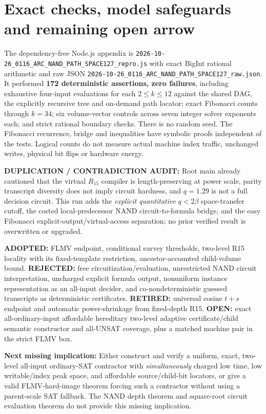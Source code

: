 \documentclass[11pt]{article}
\begin{document}
\section{Exact checks, model safeguards and remaining open arrow}
The dependency-free Node.js appendix is \texttt{2026-10-26\_0116\_ARC\_NAND\_PATH\_SPACE127\_repro.js} with exact BigInt rational arithmetic and raw JSON \texttt{2026-10-26\_0116\_ARC\_NAND\_PATH\_SPACE127\_raw.json}. It performed \textbf{172 deterministic assertions, zero failures}, including exhaustive four-input evaluations for each $2\le k\le12$ against the shared DAG, the explicitly recursive tree and on-demand path locator; exact Fibonacci counts through $k=34$; six volume-vector controls across seven integer solver exponents each; and strict rational boundary checks. There is no random seed. The Fibonacci recurrence, bridge and inequalities have symbolic proofs independent of the tests. Logical counts do not measure actual machine index traffic, unchanged writes, physical bit flips or hardware energy.

\textbf{DUPLICATION / CONTRADICTION AUDIT:} Root main already cautioned that the virtual $R_{15}$ compiler is length-preserving at power scale, parity transcript diversity does not imply circuit hardness, and $q=1.29$ is not a full decision circuit. This run adds the \emph{explicit quantitative} $q<2\beta$ space-transfer cutoff, the costed local-predecessor NAND circuit-to-formula bridge, and the easy Fibonacci explicit-output/virtual-access separation; no prior verified result is overwritten or upgraded.

\textbf{ADOPTED:} FLMV endpoint, conditional survey thresholds, two-level R15 locality with its fixed-template restriction, ancestor-accounted child-volume bound. \textbf{REJECTED:} free circuitization/evaluation, unrestricted NAND circuit interpretation, uncharged explicit formula output, nonuniform instance representation as an all-input decider, and co-nondeterministic guessed transcripts as deterministic certificates. \textbf{RETIRED:} universal cosine $t+s$ endpoint and automatic power-shrinkage from fixed-depth R15. \textbf{OPEN:} exact all-ordinary-input affordable hereditary two-level adaptive certificate/child semantic constructor and all-UNSAT coverage, plus a matched machine pair in the strict FLMV box.

\textbf{Next missing implication:} Either construct and verify a uniform, exact, two-level all-input ordinary-SAT contractor with \emph{simultaneously} charged low time, low writable/index peak space, and affordable source/child-bit locators, or give a valid FLMV-hard-image theorem forcing such a contractor without using a parent-scale SAT fallback. The NAND depth theorem and square-root circuit evaluation theorem do not provide this missing implication.
\end{document}
